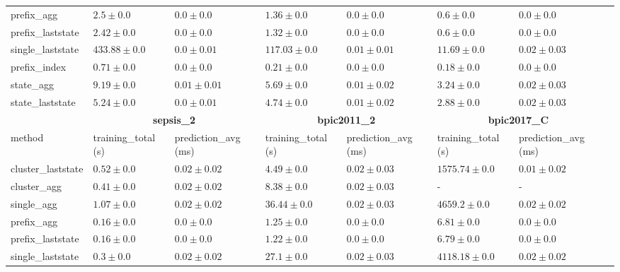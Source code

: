 \documentclass[twoside,11pt]{Latex/Classes/PhDthesisPSnPDF}
\begin{document}
\begin{table}[!htbp]
{\begin{tabular}{llllllll}
					prefix\_agg & $2.5 \pm 0.0$ & $\mathbf{0.0 \pm 0.0}$ & $1.36 \pm 0.0$ & $\mathbf{0.0 \pm 0.0}$ & $0.6 \pm 0.0$ & $\mathbf{0.0 \pm 0.0}$ \\ 
					prefix\_laststate & $2.42 \pm 0.0$ & $\mathbf{0.0 \pm 0.0}$ & $1.32 \pm 0.0$ & $\mathbf{0.0 \pm 0.0}$ & $0.6 \pm 0.0$ & $\mathbf{0.0 \pm 0.0}$ \\ 
					single\_laststate & $433.88 \pm 0.0$ & $\mathbf{0.0 \pm 0.01}$ & $117.03 \pm 0.0$ & $0.01 \pm 0.01$ & $11.69 \pm 0.0$ & $0.02 \pm 0.03$ \\ 
					prefix\_index & $\mathbf{0.71 \pm 0.0}$ & $\mathbf{0.0 \pm 0.0}$ & $\mathbf{0.21 \pm 0.0}$ & $\mathbf{0.0 \pm 0.0}$ & $\mathbf{0.18 \pm 0.0}$ & $\mathbf{0.0 \pm 0.0}$ \\ 
					state\_agg & $9.19 \pm 0.0$ & $0.01 \pm 0.01$ & $5.69 \pm 0.0$ & $0.01 \pm 0.02$ & $3.24 \pm 0.0$ & $0.02 \pm 0.03$ \\ 
					state\_laststate & $5.24 \pm 0.0$ & $\mathbf{0.0 \pm 0.01}$ & $4.74 \pm 0.0$ & $0.01 \pm 0.02$ & $2.88 \pm 0.0$ & $0.02 \pm 0.03$ \\ 
					\bottomrule
					\toprule
					& \multicolumn{2}{c}{{\bfseries sepsis\_2}} & \multicolumn{2}{c}{{\bfseries bpic2011\_2}} & \multicolumn{2}{c}{{\bfseries bpic2017\_C}} \\ \cmidrule(lr){2-3} \cmidrule(lr){4-5} \cmidrule(lr){6-7}
					method  & training\_total (s) & prediction\_avg (ms) & training\_total (s) & prediction\_avg (ms) & training\_total (s) & prediction\_avg (ms) \\ \midrule
					cluster\_laststate & $0.52 \pm 0.0$ & $0.02 \pm 0.02$ & $4.49 \pm 0.0$ & $0.02 \pm 0.03$ & $1575.74 \pm 0.0$ & $0.01 \pm 0.02$ \\ 
					cluster\_agg & $0.41 \pm 0.0$ & $0.02 \pm 0.02$ & $8.38 \pm 0.0$ & $0.02 \pm 0.03$ & - & - \\ 
					single\_agg & $1.07 \pm 0.0$ & $0.02 \pm 0.02$ & $36.44 \pm 0.0$ & $0.02 \pm 0.03$ & $4659.2 \pm 0.0$ & $0.02 \pm 0.02$ \\ 
					prefix\_agg & $0.16 \pm 0.0$ & $\mathbf{0.0 \pm 0.0}$ & $1.25 \pm 0.0$ & $\mathbf{0.0 \pm 0.0}$ & $6.81 \pm 0.0$ & $\mathbf{0.0 \pm 0.0}$ \\ 
					prefix\_laststate & $0.16 \pm 0.0$ & $\mathbf{0.0 \pm 0.0}$ & $1.22 \pm 0.0$ & $\mathbf{0.0 \pm 0.0}$ & $6.79 \pm 0.0$ & $\mathbf{0.0 \pm 0.0}$ \\ 
					single\_laststate & $0.3 \pm 0.0$ & $0.02 \pm 0.02$ & $27.1 \pm 0.0$ & $0.02 \pm 0.03$ & $4118.18 \pm 0.0$ & $0.02 \pm 0.02$ \\ 

\end{tabular}}
\end{table}
\end{document}
